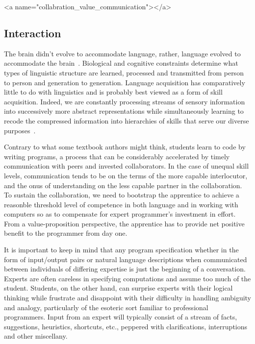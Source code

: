 
\rawhtml
<a name="collabration_value_communication"></a>
\endrawhtml
\subsection*{Interaction}


The brain didn't evolve to accommodate language, rather, language evolved to accommodate the brain~\cite{ChaterandChristiansenHLB-11}. Biological and cognitive constraints determine what types of linguistic structure are learned, processed and transmitted from person to person and generation to generation. Language acquisition has comparatively little to do with linguistics and is probably best viewed as a form of skill acquisition. Indeed, we are constantly processing streams of sensory information into successively more abstract representations while simultaneously learning to recode the compressed information into hierarchies of skills that serve our diverse purposes~\cite{ChaterandChristiansenCOiBS-18,ChateretalJML-16}.

Contrary to what some textbook authors might think, students learn to code by writing programs, a process that can be considerably accelerated by timely communication with peers and invested collaborators. In the case of unequal skill levels, communication tends to be on the terms of the more capable interlocutor, and the onus of understanding on the less capable partner in the collaboration. To sustain the collaboration, we need to bootstrap the apprentice to achieve a reasonble threshold level of competence in both language and in working with computers so as to compensate for expert programmer's investment in effort. From a value-proposition perspective, the apprentice has to provide net positive benefit to the programmer from day one.

It is important to keep in mind that any program specification whether in the form of input/output pairs or natural language descriptions when communicated between individuals of differing expertise is just the beginning of a conversation. Experts are often careless in specifying computations and assume too much of the student. Students, on the other hand, can surprise experts with their logical thinking while frustrate and disappoint with their difficulty in handling ambiguity and analogy, particularly of the esoteric sort familiar to professional programmers. Input from an expert will typically consist of a stream of facts, suggestions, heuristics, shortcuts, etc., peppered with clarifications, interruptions and other miscellany.

